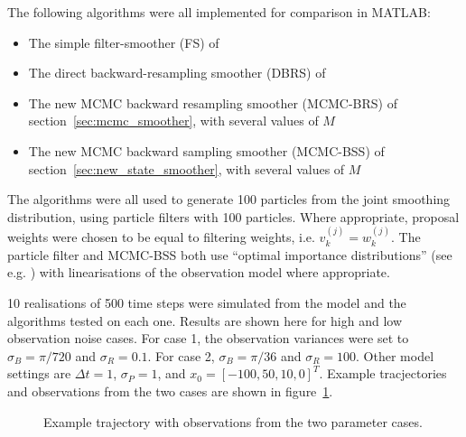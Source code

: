 \documentclass[journal]{IEEEtran}
\begin{document}
The following algorithms were all implemented for comparison in MATLAB:

\begin{itemize}
	\item The simple filter-smoother (FS) of \cite{Kitagawa1996}
	\item The direct backward-resampling smoother (DBRS) of \cite{Godsill2004}
	\item The new MCMC backward resampling smoother (MCMC-BRS) of section~\ref{sec:mcmc_smoother}, with several values of $M$
	\item The new MCMC backward sampling smoother (MCMC-BSS) of section~\ref{sec:new_state_smoother}, with several values of $M$
\end{itemize}

The algorithms were all used to generate 100 particles from the joint smoothing distribution, using particle filters with 100 particles. Where appropriate, proposal weights were chosen to be equal to filtering weights, i.e. $v_k^{(j)} = w_k^{(j)}$. The particle filter and MCMC-BSS both use ``optimal importance distributions'' (see e.g. \cite{Cappe2007}) with linearisations of the observation model where appropriate.

10 realisations of 500 time steps were simulated from the model and the algorithms tested on each one. Results are shown here for high and low observation noise cases. For case 1, the observation variances were set to $\sigma_B = \pi/720$ and $\sigma_R = 0.1$. For case 2, $\sigma_B = \pi/36$ and $\sigma_R = 100$. Other model settings are $\Delta t = 1$, $\sigma_P = 1$, and $x_0 = [-100, 50, 10, 0]^T$. Example tracjectories and observations from the two cases are shown in figure~\ref{fig:example_trajectories}.

\begin{figure}[!t]
\centerline{
\hfil
{}}
\caption{Example trajectory with observations from the two parameter cases.}
\label{fig:example_trajectories}
\end{figure}
\end{document}
